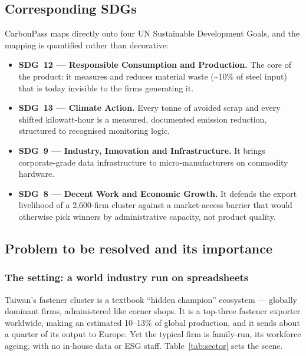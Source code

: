 \documentclass[11pt]{article}
\begin{document}
\subsection{Corresponding SDGs}
CarbonPass maps directly onto four UN Sustainable Development Goals, and the mapping is quantified rather than decorative:

\begin{itemize}[leftmargin=1.2em,itemsep=2pt,topsep=3pt]
\item \textbf{SDG~12 --- Responsible Consumption and Production.} The core of the product: it measures and reduces material waste (\textasciitilde10\% of steel input) that is today invisible to the firms generating it.
\item \textbf{SDG~13 --- Climate Action.} Every tonne of avoided scrap and every shifted kilowatt-hour is a measured, documented emission reduction, structured to recognised monitoring logic.
\item \textbf{SDG~9 --- Industry, Innovation and Infrastructure.} It brings corporate-grade data infrastructure to micro-manufacturers on commodity hardware.
\item \textbf{SDG~8 --- Decent Work and Economic Growth.} It defends the export livelihood of a 2{,}600-firm cluster against a market-access barrier that would otherwise pick winners by administrative capacity, not product quality.
\end{itemize}

\subsection{Problem to be resolved and its importance}

\subsubsection{The setting: a world industry run on spreadsheets}
Taiwan's fastener cluster is a textbook ``hidden champion'' ecosystem --- globally dominant firms, administered like corner shops. It is a top-three fastener exporter worldwide, making an estimated 10--13\% of global production, and it sends about a quarter of its output to Europe. Yet the typical firm is family-run, its workforce ageing, with no in-house data or ESG staff. Table~\ref{tab:sector} sets the scene.
\end{document}
